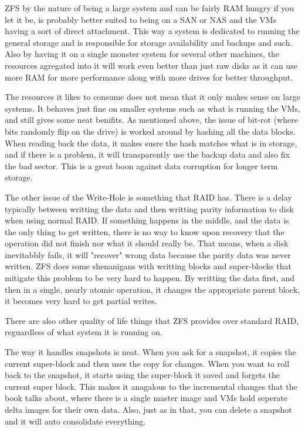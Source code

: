 \documentclass[12pt]{article}
\begin{document}
ZFS by the nature of being a large system and can be fairly RAM hungry if you let it be, is probably better suited to being on a SAN or NAS and the VMs having a sort of direct attachment.
This way a system is dedicated to running the general storage and is responsible for storage availability and backups and such.
Also by having it on a single monster system for several other machines, the resources agregated into it will work even better than just raw disks as it can use more RAM for more performance along with more drives for better throughput.

The resources it likes to consume does not mean that it only makes sense on large systems.
It behaves just fine on smaller systems such as what is running the VMs, and still gives some neat benifits.
As mentioned above, the issue of bit-rot (where bits randomly flip on the drive) is worked around by hashing all the data blocks.
When reading back the data, it makes susre the hash matches what is in storage, and if there is a problem, it will transparently use the backup data and also fix the bad sector.
This is a great boon against data corruption for longer term storage.

The other issue of the Write-Hole is something that RAID has.
There is a delay typically between writting the data and then writting parity information to disk when using normal RAID.
If something happens in the middle, and the data is the only thing to get written, there is no way to know upon recovery that the operation did not finish nor what it should really be.
That means, when a disk inevitabbly fails, it will "recover" wrong data because the parity data was never written.
ZFS does some shenanigans with writting blocks and super-blocks that mitigate this problem to be very hard to happen.
By writting the data first, and then in a single, nearly atomic operation, it changes the appropriate parent block, it becomes very hard to get partial writes.

There are also other quality of life things that ZFS provides over standard RAID, reguardless of what system it is running on.

The way it handles snapshots is neat.
When you ask for a snapshot, it copies the current super-block and then uses the copy for changes.
When you want to roll back to the snapshot, it starts using the super-block it saved and forgets the current super block.
This makes it anagalous to the incremental changes that the book talks about, where there is a single master image and VMs hold seperate delta images for their own data.
Also, just as in that, you can delete a snapshot and it will auto consolidate everything.
\end{document}
